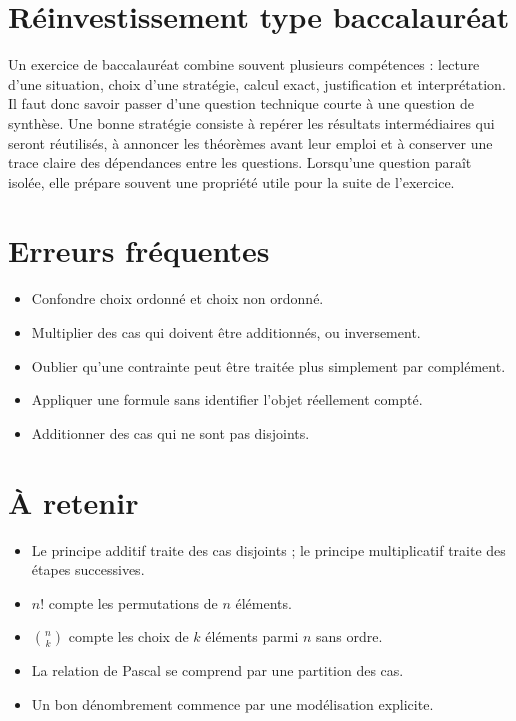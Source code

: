 \section{Réinvestissement type baccalauréat}
Un exercice de baccalauréat combine souvent plusieurs compétences : lecture d'une situation, choix d'une stratégie, calcul exact, justification et interprétation. Il faut donc savoir passer d'une question technique courte à une question de synthèse. Une bonne stratégie consiste à repérer les résultats intermédiaires qui seront réutilisés, à annoncer les théorèmes avant leur emploi et à conserver une trace claire des dépendances entre les questions. Lorsqu'une question paraît isolée, elle prépare souvent une propriété utile pour la suite de l'exercice.

\section{Erreurs fréquentes}
\begin{itemize}
\item Confondre choix ordonné et choix non ordonné.
\item Multiplier des cas qui doivent être additionnés, ou inversement.
\item Oublier qu’une contrainte peut être traitée plus simplement par complément.
\item Appliquer une formule sans identifier l’objet réellement compté.
\item Additionner des cas qui ne sont pas disjoints.
\end{itemize}

\section{À retenir}
\begin{aretenir}
\begin{itemize}
\item Le principe additif traite des cas disjoints ; le principe multiplicatif traite des étapes successives.
\item $n!$ compte les permutations de $n$ éléments.
\item $\binom{n}{k}$ compte les choix de $k$ éléments parmi $n$ sans ordre.
\item La relation de Pascal se comprend par une partition des cas.
\item Un bon dénombrement commence par une modélisation explicite.
\end{itemize}
\end{aretenir}
